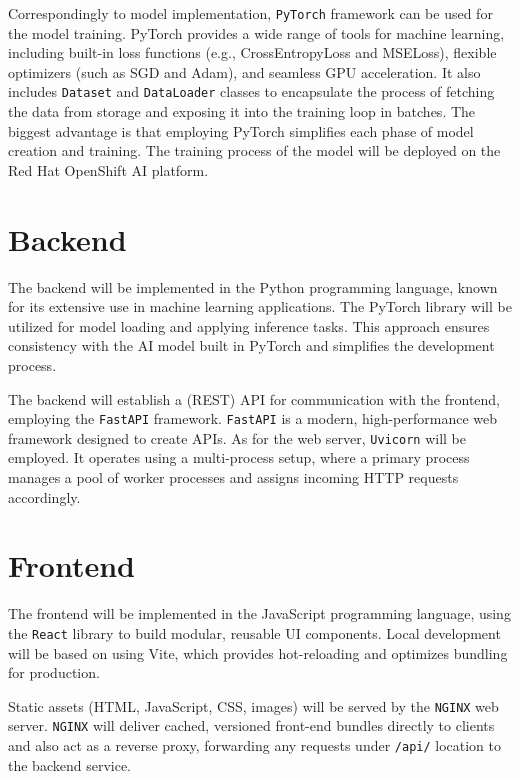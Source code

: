 Correspondingly to model implementation, \texttt{PyTorch} framework can be used for the model training. PyTorch provides a wide range of tools for machine learning, including built-in loss functions (e.g., CrossEntropyLoss and MSELoss), flexible optimizers (such as SGD and Adam), and seamless GPU acceleration. It also includes \texttt{Dataset} and \texttt{DataLoader} classes to encapsulate the process of fetching the data from storage and exposing it into the training loop in batches. The biggest advantage is that employing PyTorch simplifies each phase of model creation and training. The training process of the model will be deployed on the Red Hat OpenShift AI platform.

\section*{Backend}
\label{sec:draft-be}

The backend will be implemented in the Python programming language, known for its extensive use in machine learning applications. The PyTorch library will be utilized for model loading and applying inference tasks. This approach ensures consistency with the AI model built in PyTorch and simplifies the development process.

The backend will establish a (REST) API for communication with the frontend, employing the \texttt{FastAPI} framework. \texttt{FastAPI} is a modern, high-performance web framework designed to create APIs. As for the web server, \texttt{Uvicorn} will be employed. It operates using a multi-process setup, where a primary process manages a pool of worker processes and assigns incoming HTTP requests accordingly.

\section*{Frontend}
\label{sec:draft-fe}

The frontend will be implemented in the JavaScript programming language, using the \texttt{React} library to build modular, reusable UI components. Local development will be based on using Vite, which provides hot-reloading and optimizes bundling for production.

Static assets (HTML, JavaScript, CSS, images) will be served by the \texttt{NGINX} web server. \texttt{NGINX} will deliver cached, versioned front-end bundles directly to clients and also act as a reverse proxy, forwarding any requests under \texttt{/api/} location to the backend service. 

